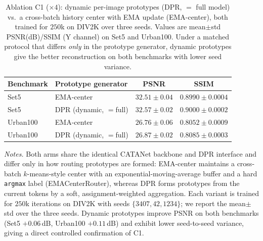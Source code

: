 \begin{table}[H]
\centering
\caption{Ablation C1 ($\times 4$): dynamic per-image prototypes (DPR, $=$ full model) vs.\ a
cross-batch history center with EMA update (EMA-center), both trained for $250$k on DIV2K
over three seeds. Values are mean$\pm$std PSNR(dB)/SSIM (Y channel) on Set5 and Urban100.
Under a matched protocol that differs \emph{only} in the prototype generator, dynamic
prototypes give the better reconstruction on both benchmarks with lower seed variance.}
\label{tab:abl_c1}
\begingroup
\scriptsize
\setlength{\tabcolsep}{3pt}
\renewcommand{\arraystretch}{1.05}
\begin{tabular*}{\columnwidth}{@{\extracolsep{\fill}}llcc}
\toprule
Benchmark & Prototype generator & PSNR & SSIM \\
\midrule
Set5     & EMA-center             & $32.51\pm0.04$ & $0.8990\pm0.0004$ \\
Set5     & DPR (dynamic, $=$full) & $\mathbf{32.57\pm0.02}$ & $\mathbf{0.9000\pm0.0002}$ \\
Urban100 & EMA-center             & $26.76\pm0.06$ & $0.8052\pm0.0009$ \\
Urban100 & DPR (dynamic, $=$full) & $\mathbf{26.87\pm0.02}$ & $\mathbf{0.8085\pm0.0003}$ \\
\bottomrule
\end{tabular*}
\endgroup

\vspace{2pt}
{\footnotesize
\textit{Notes.} Both arms share the identical CATANet backbone and DPR interface and differ
only in how routing prototypes are formed: EMA-center maintains a cross-batch $k$-means-style
center with an exponential-moving-average buffer and a hard \texttt{argmax} label
(EMACenterRouter), whereas DPR forms prototypes from the current tokens by a soft,
assignment-weighted aggregation. Each variant is trained for $250$k iterations on
DIV2K with seeds $\{3407,42,1234\}$; we report the mean$\pm$std over the three seeds. Dynamic
prototypes improve PSNR on both benchmarks (Set5 $+0.06$\,dB, Urban100 $+0.11$\,dB) and exhibit
lower seed-to-seed variance, giving a direct controlled confirmation of C1.}
\end{table}
